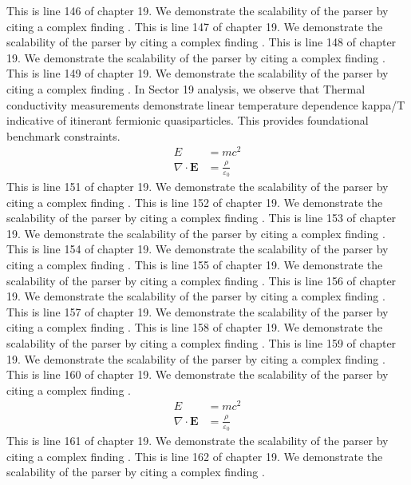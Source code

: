 This is line 146 of chapter 19. We demonstrate the scalability of the parser by citing a complex finding \cite{ref19_146}.
This is line 147 of chapter 19. We demonstrate the scalability of the parser by citing a complex finding \cite{ref19_147}.
This is line 148 of chapter 19. We demonstrate the scalability of the parser by citing a complex finding \cite{ref19_148}.
This is line 149 of chapter 19. We demonstrate the scalability of the parser by citing a complex finding \cite{ref19_149}.
In Sector 19 analysis, we observe that Thermal conductivity measurements demonstrate linear temperature dependence kappa/T indicative of itinerant fermionic quasiparticles. This provides foundational benchmark constraints.
\begin{align*}
  E &= mc^2 \\
  \nabla \cdot \mathbf{E} &= \frac{\rho}{\varepsilon_0}
\end{align*}
This is line 151 of chapter 19. We demonstrate the scalability of the parser by citing a complex finding \cite{ref19_151}.
This is line 152 of chapter 19. We demonstrate the scalability of the parser by citing a complex finding \cite{ref19_152}.
This is line 153 of chapter 19. We demonstrate the scalability of the parser by citing a complex finding \cite{ref19_153}.
This is line 154 of chapter 19. We demonstrate the scalability of the parser by citing a complex finding \cite{ref19_154}.
This is line 155 of chapter 19. We demonstrate the scalability of the parser by citing a complex finding \cite{ref19_155}.
This is line 156 of chapter 19. We demonstrate the scalability of the parser by citing a complex finding \cite{ref19_156}.
This is line 157 of chapter 19. We demonstrate the scalability of the parser by citing a complex finding \cite{ref19_157}.
This is line 158 of chapter 19. We demonstrate the scalability of the parser by citing a complex finding \cite{ref19_158}.
This is line 159 of chapter 19. We demonstrate the scalability of the parser by citing a complex finding \cite{ref19_159}.
This is line 160 of chapter 19. We demonstrate the scalability of the parser by citing a complex finding \cite{ref19_160}.
\begin{align*}
  E &= mc^2 \\
  \nabla \cdot \mathbf{E} &= \frac{\rho}{\varepsilon_0}
\end{align*}
This is line 161 of chapter 19. We demonstrate the scalability of the parser by citing a complex finding \cite{ref19_161}.
This is line 162 of chapter 19. We demonstrate the scalability of the parser by citing a complex finding \cite{ref19_162}.
